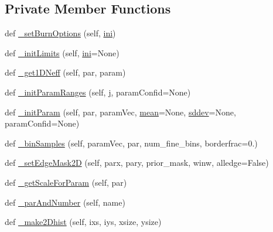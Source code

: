 \subsection*{Private Member Functions}
\begin{DoxyCompactItemize}
\item 
def \mbox{\hyperlink{classgetdist_1_1mcsamples_1_1MCSamples_a6cbc5f8ec4356d9ef56c6858a88d9ed6}{\+\_\+set\+Burn\+Options}} (self, \mbox{\hyperlink{classgetdist_1_1mcsamples_1_1MCSamples_a770e848532e7a9eeb2b0f24cb1bc1573}{ini}})
\item 
def \mbox{\hyperlink{classgetdist_1_1mcsamples_1_1MCSamples_a33b6439bd4c616568c29c628ed3e75f1}{\+\_\+init\+Limits}} (self, \mbox{\hyperlink{classgetdist_1_1mcsamples_1_1MCSamples_a770e848532e7a9eeb2b0f24cb1bc1573}{ini}}=None)
\item 
def \mbox{\hyperlink{classgetdist_1_1mcsamples_1_1MCSamples_ab2849686882a2194c2e3c67e722cde18}{\+\_\+get1\+D\+Neff}} (self, par, param)
\item 
def \mbox{\hyperlink{classgetdist_1_1mcsamples_1_1MCSamples_a6b6dd422ba0e76f758c0ac875ea6ad74}{\+\_\+init\+Param\+Ranges}} (self, \mbox{\hyperlink{plotcls_8m_ac86694252f8dfdb19aaeadc4b7c342c6}{j}}, param\+Confid=None)
\item 
def \mbox{\hyperlink{classgetdist_1_1mcsamples_1_1MCSamples_ab6b6a1e603f89d1266dd7d2f5e6ae51c}{\+\_\+init\+Param}} (self, par, param\+Vec, \mbox{\hyperlink{classgetdist_1_1chains_1_1WeightedSamples_a72a6f011746d852ea089302d90f59159}{mean}}=None, \mbox{\hyperlink{classgetdist_1_1chains_1_1WeightedSamples_a739f1abc86f6ff5f37eb2f0fe919050d}{sddev}}=None, param\+Confid=None)
\item 
def \mbox{\hyperlink{classgetdist_1_1mcsamples_1_1MCSamples_a857a2912d26818c22998c9480ffb4019}{\+\_\+bin\+Samples}} (self, param\+Vec, par, num\+\_\+fine\+\_\+bins, borderfrac=0.)
\item 
def \mbox{\hyperlink{classgetdist_1_1mcsamples_1_1MCSamples_ad01cbb023ef1ede5d50f0f81439146a8}{\+\_\+set\+Edge\+Mask2D}} (self, parx, pary, prior\+\_\+mask, winw, alledge=False)
\item 
def \mbox{\hyperlink{classgetdist_1_1mcsamples_1_1MCSamples_a1d4ac9d66e1401a3a2e082cd18393f2b}{\+\_\+get\+Scale\+For\+Param}} (self, par)
\item 
def \mbox{\hyperlink{classgetdist_1_1mcsamples_1_1MCSamples_a6ffc3541b4b059fe621867360b2701fd}{\+\_\+par\+And\+Number}} (self, name)
\item 
def \mbox{\hyperlink{classgetdist_1_1mcsamples_1_1MCSamples_a0da5ffb0dd8b41cea131a5cb8fd9202f}{\+\_\+make2\+Dhist}} (self, ixs, iys, xsize, ysize)

\end{DoxyCompactItemize}

